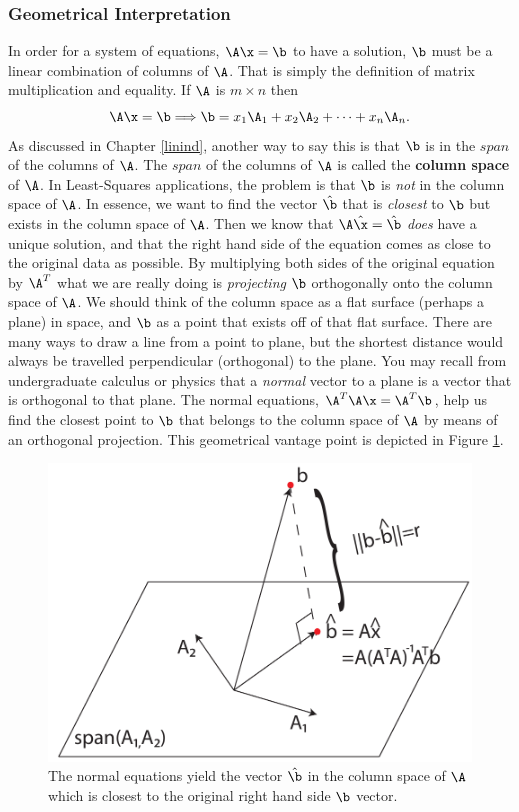 \documentclass[
]{article}
\theoremstyle{definition}
\theoremstyle{definition}
\theoremstyle{definition}
\theoremstyle{definition}
\theoremstyle{remark}
\begin{document}
\hypertarget{geometrical-interpretation}{%
\subsubsection{Geometrical Interpretation}\label{geometrical-interpretation}}

In order for a system of equations, \(\A\x=\b\) to have a solution, \(\b\) must be a linear combination of columns of \(\A\). That is simply the definition of matrix multiplication and equality. If \(\A\) is \(m\times n\) then
\[\A\x=\b \Longrightarrow \b = x_1\A_1+x_2\A_2+\dots+x_n\A_n.\]
As discussed in Chapter \ref{linind}, another way to say this is that \(\b\) is in the \(span\) of the columns of \(\A\). The \(span\) of the columns of \(\A\) is called the \textbf{column space} of \(\A\). In Least-Squares applications, the problem is that \(\b\) is \emph{not} in the column space of \(\A\). In essence, we want to find the vector \(\hat{\b}\) that is \emph{closest} to \(\b\) but exists in the column space of \(\A\). Then we know that \(\A\hat{\x}=\hat{\b}\) \emph{does} have a unique solution, and that the right hand side of the equation comes as close to the original data as possible. By multiplying both sides of the original equation by \(\A^T\) what we are really doing is \emph{projecting} \(\b\) orthogonally onto the column space of \(\A\). We should think of the column space as a flat surface (perhaps a plane) in space, and \(\b\) as a point that exists off of that flat surface. There are many ways to draw a line from a point to plane, but the shortest distance would always be travelled perpendicular (orthogonal) to the plane. You may recall from undergraduate calculus or physics that a \emph{normal} vector to a plane is a vector that is orthogonal to that plane. The normal equations, \(\A^T\A\x=\A^T\b\), help us find the closest point to \(\b\) that belongs to the column space of \(\A\) by means of an orthogonal projection. This geometrical vantage point is depicted in Figure \ref{fig:lsproj}.



\begin{figure}

{\centering \includegraphics[width=0.6\linewidth]{figs/lsproj} 

}

\caption{The normal equations yield the vector \(\hat{\b}\) in the column space of \(\A\) which is closest to the original right hand side \(\b\) vector.}\label{fig:lsproj}
\end{figure}
\end{document}
